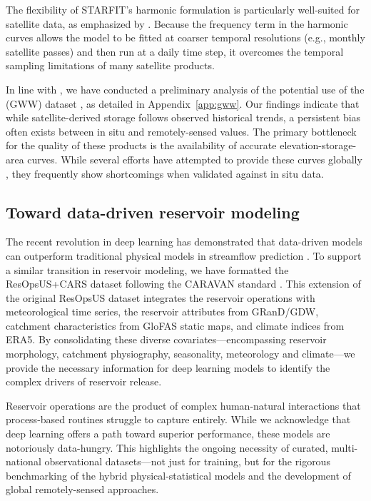 \documentclass[hess, manuscript]{copernicus}
\begin{document}
The flexibility of STARFIT’s harmonic formulation is particularly well-suited for satellite data, as emphasized by \citet{Steyaert2025}. Because the frequency term in the harmonic curves allows the model to be fitted at coarser temporal resolutions (e.g., monthly satellite passes) and then run at a daily time step, it overcomes the temporal sampling limitations of many satellite products.

In line with \citet{Shen2025}, we have conducted a preliminary analysis of the potential use of the (GWW) dataset \citep{Donchyts2022}, as detailed in Appendix~\ref{app:gww}. Our findings indicate that while satellite-derived storage follows observed historical trends, a persistent bias often exists between in situ and remotely-sensed values. The primary bottleneck for the quality of these products is the availability of accurate elevation-storage-area curves. While several efforts have attempted to provide these curves globally \citep{Yigzaw2018, Busker2019, Khazaei2022}, they frequently show shortcomings when validated against in situ data.

\subsection{Toward data-driven reservoir modeling}
\label{sec:data-driven}

The recent revolution in deep learning has demonstrated that data-driven models can outperform traditional physical models in streamflow prediction \citep{Nearing2024}. To support a similar transition in reservoir modeling, we have formatted the ResOpsUS+CARS dataset following the CARAVAN standard \citep{Kratzert2023}. This extension of the original ResOpsUS dataset \citep{Steyaert2022} integrates the reservoir operations with meteorological time series, the reservoir attributes from GRanD/GDW, catchment characteristics from GloFAS static maps, and climate indices from ERA5. By consolidating these diverse covariates—encompassing reservoir morphology, catchment physiography, seasonality, meteorology and climate—we provide the necessary information for deep learning models to identify the complex drivers of reservoir release.  

Reservoir operations are the product of complex human-natural interactions that process-based routines struggle to capture entirely. While we acknowledge that deep learning offers a path toward superior performance, these models are notoriously data-hungry. This highlights the ongoing necessity of curated, multi-national observational datasets—not just for training, but for the rigorous benchmarking of the hybrid physical-statistical models and the development of global remotely-sensed approaches.
\end{document}

